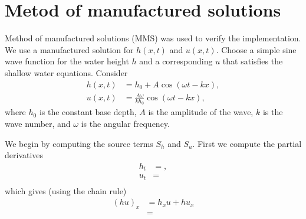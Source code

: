 \section{Metod of manufactured solutions}
Method of manufactured solutions (MMS) was used to verify the implementation.
We use a manufactured solution for $h(x,t)$ and $u(x,t)$.
Choose a simple sine wave function for the water height $h$ and a corresponding $u$ that satisfies the shallow water equations.
Consider
\begin{align*}
    h(x,t) &= h_0 + A \cos(\omega t - kx), \\
    u(x,t) &= \frac{ A \omega }{k h_0}  \cos(\omega t - kx),
\end{align*} 
where $h_0$ is the constant base depth, $A$ is the amplitude of the wave, $k$ is the wave number, and $\omega$ is the angular frequency.

We begin by computing the source terms $S_h$ and $S_u$.
First we compute the partial derivatives
\begin{align*}
    h_t &= ,\\
    u_t &=  \\
\end{align*}
which gives (using the chain rule)
\begin{align*}
    {(hu)}_x &= h_x u + h u_x \\
    &= 
\end{align*}



